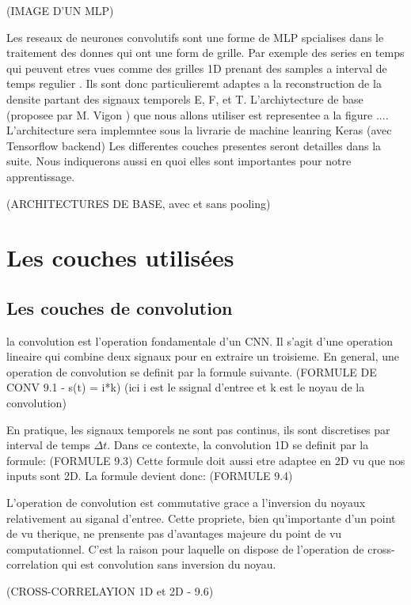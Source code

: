 (IMAGE D'UN MLP)

Les reseaux de neurones convolutifs sont une forme de MLP spcialises dans le traitement des donnes qui ont une form de grille. Par exemple des series en temps qui peuvent etres vues comme des grilles 1D prenant des samples a interval de temps regulier \parencite{Reference5}. Ils sont donc particulieremt adaptes a la reconstruction de la densite partant des signaux temporels E, F, et T. L'archiytecture de base (proposee par M. Vigon ) que nous allons utiliser est representee a la figure .... L'architecture sera implemntee sous la livrarie de machine leanring Keras (avec Tensorflow backend) Les differentes couches presentes seront detailles dans la suite. Nous indiquerons aussi en quoi elles sont importantes pour notre apprentissage.

(ARCHITECTURES DE BASE, avec et sans pooling)


\section{Les couches utilisées}

\subsection{Les couches de convolution}
la convolution est l'operation fondamentale d'un CNN. Il s'agit d'une operation lineaire qui combine deux signaux pour en extraire un troisieme. En general, une operation de convolution se definit par la formule suivante.
(FORMULE DE CONV 9.1 - s(t) = i*k) (ici i est le ssignal d'entree et k est le noyau de la convolution)

En pratique, les signaux temporels ne sont pas continus, ils sont discretises par interval de temps $\Delta t$. Dans ce contexte, la convolution 1D se definit par la formule:
(FORMULE 9.3)
Cette formule doit aussi etre adaptee en 2D vu que nos inputs sont 2D. La formule devient donc:
(FORMULE 9.4)

L'operation de convolution est commutative grace a l'inversion du noyaux relativement au siganal d'entree. Cette propriete, bien qu'importante d'un point de vu therique, ne prensente pas d'avantages majeure du point de vu computationnel. C'est la raison pour laquelle on dispose de l'operation de cross-correlation qui est convolution sans inversion du noyau.

(CROSS-CORRELAYION 1D et 2D - 9.6)

